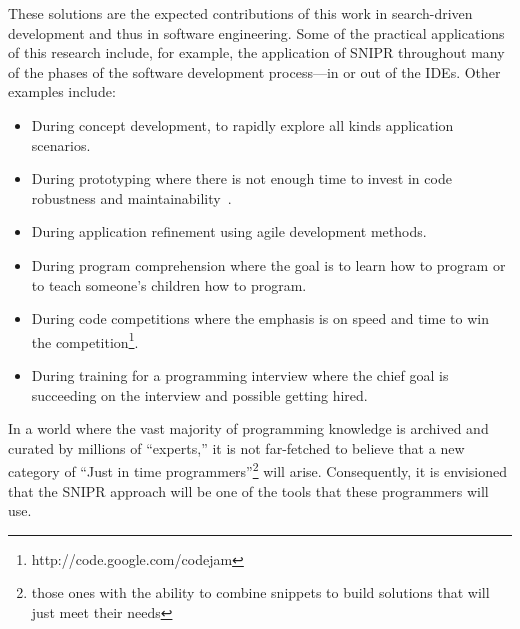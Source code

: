 These solutions are the expected contributions of this work in search-driven development and thus in software engineering. Some of the practical applications of this research include, for example, the application of \uppercase{SnipR} throughout many of the phases of the software development process---in or out of the IDEs. Other examples include: 

\begin{itemize}
\item During concept development, to rapidly explore all kinds application scenarios.
\item During prototyping where there is not enough time to invest in 
    code robustness and maintainability~\cite{Brandt:2008wi, Ncube:2008fm, Brandt:2009jb}. 
\item During application refinement using agile development methods. 
\item During program comprehension where the goal is to learn how to program or 
    to teach someone's children how to program.  
\item During code competitions where the emphasis is on speed and time to win 
    the competition\footnote{http://code.google.com/codejam}.
\item During training for a programming interview where the chief goal is succeeding on the 
    interview and possible getting hired.
\end{itemize}

In a world where the vast majority of programming knowledge is archived and curated by millions of ``experts,'' it is not far-fetched to believe that a new category of ``Just in time programmers''\footnote{those ones with the ability to combine snippets to build solutions that will just meet their needs} will arise. Consequently, it is envisioned that the \uppercase{SnipR} approach will be one of the tools that these programmers will use. 



